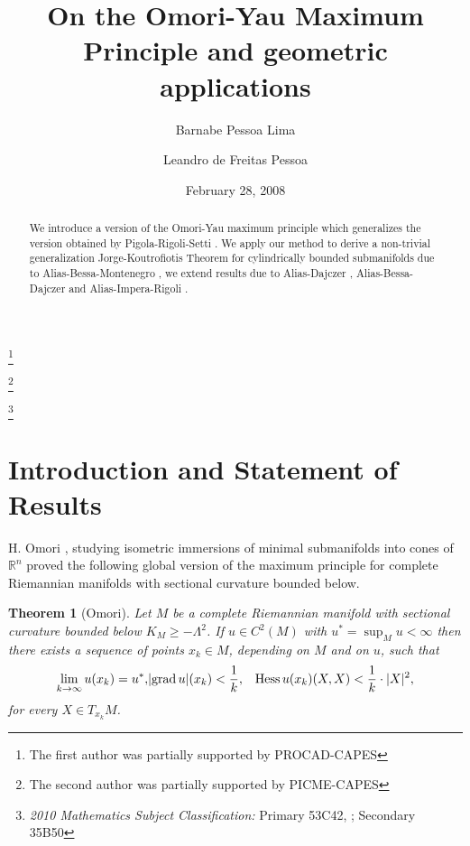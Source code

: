\documentclass[a4paper]{amsart}
\newtheorem{theorem}{Theorem}
\begin{document}
\title[On the Omori-Yau Maximum Principle and geometric applications]{On the Omori-Yau Maximum Principle and geometric applications}
{\author{Barnabe Pessoa Lima}
\address{Departamento de Matem\'{a}tica-UFPI\\
64049-550-Teresina-PI-Br}  \thanks{The first author was partially supported by PROCAD-CAPES}}
{\author{Leandro de Freitas Pessoa}
\address{Departamento de Matem\'{a}tica-UFPI\\
64049-550-Teresina-PI-Br}  \thanks{The second author was partially supported by PICME-CAPES }}
\date{February 28, 2008}
\footnote{{\it 2010 Mathematics Subject Classification:} Primary 53C42, ; Secondary 35B50}

\maketitle

\begin{abstract}We  introduce a version of the Omori-Yau maximum principle which generalizes the version obtained by Pigola-Rigoli-Setti \cite{prs-memoirs}. We apply our method to derive a non-trivial generalization  Jorge-Koutrofiotis Theorem  \cite{jorge-koutrofiotis} for cylindrically bounded submanifolds  due to Alias-Bessa-Montenegro \cite{alias-bessa-montenegro}, we extend results due to Alias-Dajczer \cite{alias-dajczer}, Alias-Bessa-Dajczer \cite{alias-bessa-dajczer} and Alias-Impera-Rigoli \cite{alias-impera-rigoli}.
\end{abstract}

\vspace{.2mm}

\section{Introduction and Statement of Results}

H. Omori \cite{omori}, studying isometric immersions of minimal submanifolds into cones of $\mathbb{R}^{n}$ proved the following global version of the maximum principle  for complete Riemannian manifolds with sectional curvature bounded below.

\begin{theorem}[Omori] \label{r1}  Let $M$ be a complete Riemannian manifold with sectional curvature  bounded below $K_{M}\geq -\Lambda^{2}$. If  $u\in C^{2}(M)$ with $u^{\ast}=\sup_{M}u<\infty$ then there exists a sequence of points $x_{k}\in M$, depending on $M$ and on $u$,  such that
\begin{eqnarray}\label{eq-omori}
\lim_{k\to \infty}u(x_{k}) =u^{\ast},& \vert {{{\rm{grad}\,}}} u\vert  (x_{k}) < \displaystyle \frac{1}{k},&  \operatorname{Hess} u(x_{k})(X,X) <  \displaystyle \frac{1}{k}\cdot \vert  X \vert^{2},
\end{eqnarray}for every $X\in T_{x_k}M$.
\end{theorem}
\end{document}
